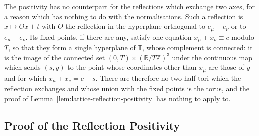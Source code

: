 \documentclass[11pt]{preprint}
\numberwithin{equation}{section}
\theoremstyle{definition}
\theoremstyle{remark}
\theoremstyle{plain}
\begin{document}
The positivity has no counterpart for the reflections which exchange two axes, for a reason which has nothing to do with the normalisations. Such a reflection is $x \mapsto Ox + t$ with $O$ the reflection in the hyperplane orthogonal to $e_\mu - e_\nu$ or to $e_\mu + e_\nu$. Its fixed points, if there are any, satisfy one equation $x_\mu \mp x_\nu \equiv c$ modulo $T$, so that they form a single hyperplane of $\mathbb T$, whose complement is connected: it is the image of the connected set $(0, T) \times (\mathbb R/T\mathbb Z)^3$ under the continuous map which sends $(s, y)$ to the point whose coordinates other than $x_\mu$ are those of $y$ and for which $x_\mu \mp x_\nu = c + s$. There are therefore no two half-tori which the reflection exchanges and whose union with the fixed points is the torus, and the proof of Lemma~\ref{lem:lattice-reflection-positivity} has nothing to apply to.

\subsection{Proof of the Reflection Positivity}\label{sec:proof-reflection-positivity}
\end{document}
